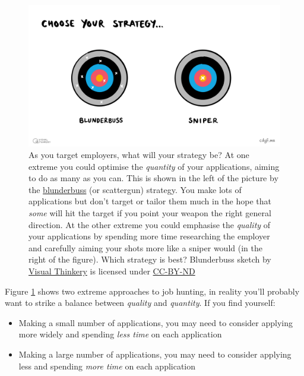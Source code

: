 \documentclass[
]{book}
\providecommand{\tightlist}{%
  \setlength{\itemsep}{0pt}\setlength{\parskip}{0pt}}
\begin{document}
\begin{figure}

{\centering \includegraphics[width=1\linewidth]{images/Blunderbuss} 

}

\caption{As you target employers, what will your strategy be? At one extreme you could optimise the \emph{quantity} of your applications, aiming to do as many as you can. This is shown in the left of the picture by the \href{https://en.wikipedia.org/wiki/Blunderbuss}{blunderbuss} (or scattergun) strategy. You make lots of applications but don't target or tailor them much in the hope that \emph{some} will hit the target if you point your weapon the right general direction. At the other extreme you could emphasise the \emph{quality} of your applications by spending more time researching the employer and carefully aiming your shots more like a sniper would (in the right of the figure). Which strategy is best? Blunderbuss sketch by \href{https://visualthinkery.com/}{Visual Thinkery} is licensed under \href{https://creativecommons.org/licenses/by-nd/4.0/}{CC-BY-ND}}\label{fig:blunderbuss-fig}
\end{figure}



Figure \ref{fig:blunderbuss-fig} shows two extreme approaches to job hunting, in reality you'll probably want to strike a balance between \emph{quality} and \emph{quantity}. If you find yourself:

\begin{itemize}
\tightlist
\item
  Making a small number of applications, you may need to consider applying more widely and spending \emph{less time} on each application
\item
  Making a large number of applications, you may need to consider applying less and spending \emph{more time} on each application
\end{itemize}
\end{document}
